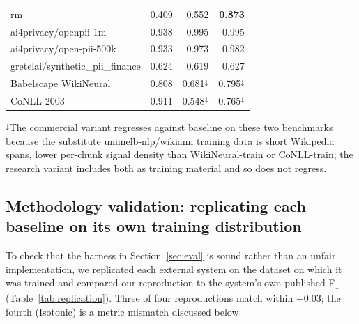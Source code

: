 \documentclass[sigconf,nonacm]{acmart}
\begin{document}
\begin{table}[!htbp]
\begin{tabular}{l r r r}
\quad rm                                        & 0.409     & 0.552     & \textbf{0.873} \\
\textsf{ai4privacy/openpii-1m}                  & 0.938     & 0.995     & 0.995     \\
\textsf{ai4privacy/open-pii-500k}               & 0.933     & 0.973     & 0.982     \\
\textsf{gretelai/synthetic\_pii\_finance}       & 0.624     & 0.619     & 0.627     \\
Babelscape \textsf{WikiNeural}                  & 0.808     & 0.681$^\downarrow$ & 0.795$^\downarrow$ \\
CoNLL-2003                                      & 0.911     & 0.548$^\downarrow$ & 0.765$^\downarrow$ \\
\bottomrule
\end{tabular}
\end{table}

\noindent$^\downarrow$The commercial variant regresses against
baseline on these two benchmarks because the substitute
\textsf{unimelb-nlp/wikiann} training data is short Wikipedia
spans, lower per-chunk signal density than
\textsf{WikiNeural}-train or CoNLL-train; the research variant
includes both as training material and so does not regress.

\subsection{Methodology validation: replicating each baseline on its own training distribution}
\label{app:replication}

To check that the harness in Section~\ref{sec:eval} is sound rather
than an unfair implementation, we replicated each external system on
the dataset on which it was trained and compared our reproduction to
the system's own published F\textsubscript{1}
(Table~\ref{tab:replication}). Three of four reproductions match
within $\pm$0.03; the fourth (Isotonic) is a metric mismatch
discussed below.
\end{document}
